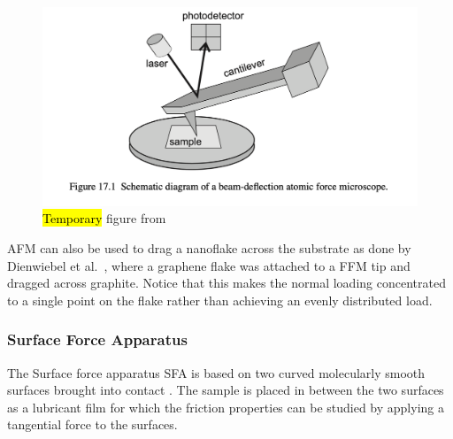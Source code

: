 \begin{figure}[H]
  \centering
  \includegraphics[width=0.6\linewidth]{figures/theory/AFM.png}
  \caption{\hl{Temporary} figure from \cite[p. 184]{gnecco_meyer_2015}}
  \label{fig:AFM}
\end{figure}


\acrshort{AFM} can also be used to drag a nanoflake across the substrate as done by
Dienwiebel et al.\ \cite{DIENWIEBEL2005197}, where a graphene flake was attached
to a \acrshort{FFM} tip and dragged across graphite. Notice that this makes the normal
loading concentrated to a single point on the flake rather than achieving an evenly distributed load. 



\subsubsection{Surface Force Apparatus}
The Surface force apparatus \acrshort{SFA} is based on two curved molecularly smooth surfaces brought into contact \cite[p. 188]{gnecco_meyer_2015}. The sample is placed in between the two surfaces as a lubricant film for which the friction properties can be studied by applying a tangential force to the surfaces. 













